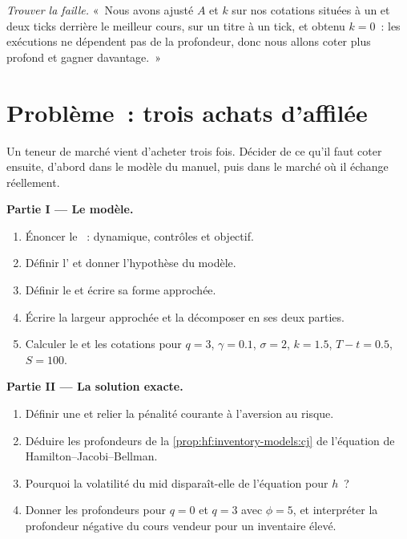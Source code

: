 \begin{exercise}[$\star\star\star$]\label{exo:hf:inventory-models:8}
\emph{Trouver la faille.} «~Nous avons ajusté $A$ et $k$ sur nos cotations situées à un et deux ticks derrière le meilleur cours, sur un titre à un tick, et obtenu $k=0$~: les exécutions
ne dépendent pas de la profondeur, donc nous allons coter plus profond et gagner davantage.~»
\end{exercise}

\section{Problème~: trois achats d'affilée}

\begin{problem}\label{pb:hf:inventory-models:1}
Un teneur de marché vient d'acheter trois fois. Décider de ce qu'il faut coter ensuite, d'abord dans le modèle du manuel, puis dans le marché où il échange réellement.

\medskip\noindent\textbf{Partie I --- Le modèle.}
\begin{enumerate}
\item Énoncer le ~: dynamique, contrôles et objectif.
\item Définir l' et donner l'hypothèse du modèle.
\item Définir le  et écrire sa forme approchée.
\item Écrire la largeur approchée et la décomposer en ses deux parties.
\item Calculer le  et les cotations pour $q=3$, $\gamma=0.1$, $\sigma=2$, $k=1.5$, $T-t=0.5$, $S=100$.
\end{enumerate}

\medskip\noindent\textbf{Partie II --- La solution exacte.}
\begin{enumerate}[resume]
\item Définir une  et relier la pénalité courante à l'aversion au risque.
\item Déduire les profondeurs de la \cref{prop:hf:inventory-models:cj} de l'équation de Hamilton--Jacobi--Bellman.
\item Pourquoi la volatilité du mid disparaît-elle de l'équation pour $h$~?
\item Donner les profondeurs pour $q=0$ et $q=3$ avec $\phi=5$, et interpréter la profondeur négative du cours vendeur pour un inventaire élevé.
\end{enumerate}


\end{problem}
